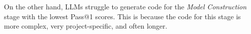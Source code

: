 
On the other hand, LLMs struggle to generate code for the \textit{Model Construction} stage with the
lowest Pass@1 scores.
This is because the code for this stage is more complex, very project-specific, and often longer.

%
%




